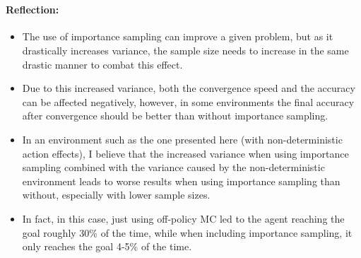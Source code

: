 \documentclass[11pt]{article}
\providecommand{\tightlist}{%
      \setlength{\itemsep}{0pt}\setlength{\parskip}{0pt}}
\begin{document}
    \begin{center}
    \end{center}
    { \hspace*{\fill} \\}
    
    \hypertarget{reflection}{%
\paragraph{Reflection:}\label{reflection}}

\begin{itemize}
\tightlist
\item
  The use of importance sampling can improve a given problem, but as it
  drastically increases variance, the sample size needs to increase in
  the same drastic manner to combat this effect.
\item
  Due to this increased variance, both the convergence speed and the
  accuracy can be affected negatively, however, in some environments the
  final accuracy after convergence should be better than without
  importance sampling.
\item
  In an environment such as the one presented here (with
  non-deterministic action effects), I believe that the increased
  variance when using importance sampling combined with the variance
  caused by the non-deterministic environment leads to worse results
  when using importance sampling than without, especially with lower
  sample sizes.
\item
  In fact, in this case, just using off-policy MC led to the agent
  reaching the goal roughly 30\% of the time, while when including
  importance sampling, it only reaches the goal 4-5\% of the time.
\end{itemize}


    
    
    
\end{document}
